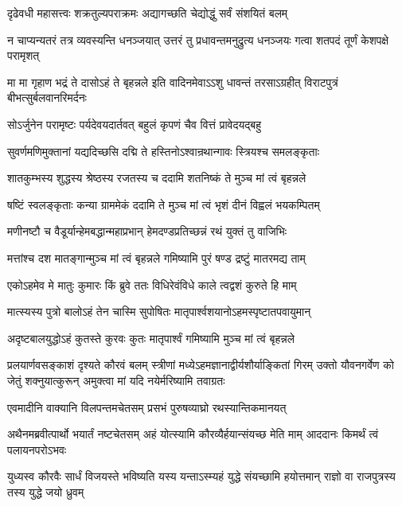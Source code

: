 \twolineshloka
{दृढेवधी महासत्त्वः शक्रतुल्यपराक्रमः}
{अद्यागच्छति चेद्योद्धुं सर्वं संशयितं बलम्}


\onelineshloka
{न चाप्यन्यतरं तत्र व्यवस्यन्ति धनञ्जयात्}
\twolineshloka
{उत्तरं तु प्रधावन्तमनुद्रुत्य धनञ्जयः}
{गत्वा शतपदं तूर्णं केशपक्षे परामृशत्}


\threelineshloka
{मा मा गृहाण भद्रं ते दासोऽहं ते बृहन्नले}
{इति वादिनमेवाऽऽशु धावन्तं तरसाऽग्रहीत्}
{विराटपुत्रं बीभत्सुर्बलवानरिमर्दनः}


\twolineshloka
{सोऽर्जुनेन परामृष्टः पर्यदेवयदार्तवत्}
{बहुलं कृपणं चैव वित्तं प्रावेदयद्बहु}


\twolineshloka
{सुवर्णमणिमुक्तानां यद्यदिच्छसि दद्मि ते}
{हस्तिनोऽश्वान्रथान्गावः स्त्रियश्च समलङ्कृताः}


\twolineshloka
{शातकुम्भस्य शुद्धस्य श्रेष्ठस्य रजतस्य च}
{ददामि शतनिष्कं ते मुञ्च मां त्वं बृहन्नले}


\twolineshloka
{षष्टिं स्वलङ्कृताः कन्या ग्राममेकं ददामि ते}
{मुञ्च मां त्वं भृशं दीनं विह्वलं भयकम्पितम्}


\twolineshloka
{मणीनष्टौ च वैडूर्यान्हेमबद्धान्महाप्रभान्}
{हेमदण्डप्रतिच्छन्नं रथं युक्तं तु वाजिभिः}


\twolineshloka
{मत्तांश्च दश मातङ्गान्मुञ्च मां त्वं बृहन्नले}
{गमिष्यामि पुरं षण्ड द्रष्टुं मातरमद्य ताम्}


\twolineshloka
{एकोऽहमेव मे मातुः कुमारः किं ब्रुवे ततः}
{विधिरेवंविधे काले त्वद्वशं कुरुते हि माम्}


\twolineshloka
{मात्स्यस्य पुत्रो बालोऽहं तेन चास्मि सुपोषितः}
{मातृपार्श्वशयानोऽहमस्पृष्टातपवायुमान्}


\twolineshloka
{अदृष्टबालयुद्धोऽहं कुतस्ते कुरवः कुतः}
{मातृपार्श्वं गमिष्यामि मुञ्च मां त्वं बृहन्नले}


\onelineshloka
{प्रलयार्णवसङ्काशं दृश्यते कौरवं बलम्}
\threelineshloka
{स्त्रीणां मध्येऽहमज्ञानाद्वीर्यशौर्याङ्कितां गिरम्}
{उक्तो यौवनगर्वेण को जेतुं शक्नुयात्कुरून्}
{अमुक्त्वा मां यदि नयेर्मरिष्यामि तवाग्रतः}



\twolineshloka
{एवमादीनि वाक्यानि विलपन्तमचेतसम्}
{प्रसभं पुरुषव्याघ्रो रथस्यान्तिकमानयत्}


\onelineshloka
{अथैनमब्रवीत्पार्थो भयार्तं नष्टचेतसम्}
\twolineshloka
{अहं योत्स्यामि कौरव्यैर्हयान्संयच्छ मेति माम्}
{आददानः किमर्थं त्वं पलायनपरोऽभवः}


\threelineshloka
{युध्यस्व कौरवैः सार्धं विजयस्ते भविष्यति}
{यस्य यन्ताऽस्म्यहं युद्धे संयच्छामि हयोत्तमान्}
{राज्ञो वा राजपुत्रस्य तस्य युद्धे जयो ध्रुवम्}



